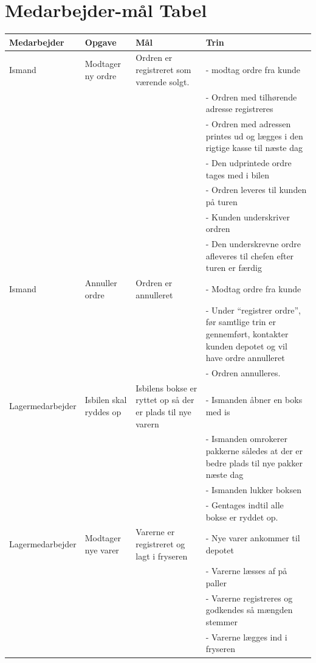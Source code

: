 \section{Medarbejder-mål Tabel}
\begin{center}
\begin{longtable}{ |p{90pt}|p{90pt}|p{90pt}|p{90pt}| }
    \hline
    Medarbejder & Opgave & Mål & Trin \\
    \hline\hline
    Ismand
    & Modtager ny ordre & Ordren er registreret som værende solgt. &
    - modtag ordre fra kunde \\
    &&&
    - Ordren med tilhørende adresse registreres \\
    &&&
    - Ordren med adressen printes ud og lægges i den rigtige kasse til næste dag \\
    &&&
    - Den udprintede ordre tages med i bilen \\
    &&&
    - Ordren leveres til kunden på turen \\
    &&&
    - Kunden underskriver ordren \\
    &&&
    - Den underskrevne ordre afleveres til chefen efter turen er færdig \\
    \hline
    Ismand & Annuller ordre & Ordren er annulleret &
    - Modtag ordre fra kunde \\
    &&&
    - Under “registrer ordre”, før samtlige trin er gennemført, kontakter kunden depotet og vil have ordre annulleret \\
    &&&
    - Ordren annulleres. \\
    \hline
    Lagermedarbejder
    & Isbilen skal ryddes op & Isbilens bokse er ryttet op så der er plads til nye varern &
    - Ismanden åbner en boks med is \\
    &&&
    - Ismanden omrokerer pakkerne således at der er bedre plads til nye pakker næste dag \\
    &&&
    - Ismanden lukker boksen \\
    &&&
    - Gentages indtil alle bokse er ryddet op. \\
    \hline
    Lagermedarbejder
    & Modtager nye varer & Varerne er registreret og lagt i fryseren &
    - Nye varer ankommer til depotet \\
    &&&
    - Varerne læsses af på paller \\
    &&&
    - Varerne registreres og godkendes så mængden stemmer \\
    &&&
    - Varerne lægges ind i fryseren \\
    \hline

\end{longtable}
\end{center}
